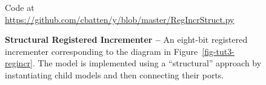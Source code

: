
\begin{figure}

  

  \centerline{\small Code at
    \url{https://github.com/cbatten/y/blob/master/RegIncrStruct.py}}

  \caption{\textbf{Structural Registered Incrementer --} An eight-bit
    registered incrementer corresponding to the diagram in
    Figure~\ref{fig-tut3-regincr}. The model is implemented using a
    ``structural'' approach by instantiating child models and then
    connecting their ports.}
  \label{code-tut3-regincr-struct}

\end{figure}

